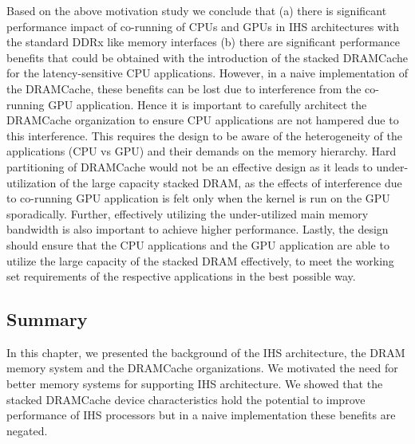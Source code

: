 \par Based on the above motivation study we conclude that (a) there is significant performance impact of co-running of CPUs and GPUs in IHS architectures with the standard DDRx like memory interfaces (b) there are significant performance benefits that could be obtained 
with the introduction of the stacked DRAMCache for the latency-sensitive CPU applications. However, in a naive implementation
of the DRAMCache, these benefits can be lost due to interference from the co-running GPU application.  Hence it is important to carefully 
architect the DRAMCache organization to ensure CPU applications are not hampered due to this interference.
This requires the design to be aware of the heterogeneity of the applications (CPU vs GPU) and their demands on the 
memory hierarchy.  Hard partitioning of DRAMCache would not be an effective design as it leads to under-utilization of the large capacity 
stacked DRAM, as the effects of interference due to co-running GPU application is felt only when the kernel is run on the GPU sporadically. 
Further, effectively utilizing the under-utilized main memory bandwidth \cite{micro-refresh, mainak-hpca, bear}
is also important to achieve higher performance.  Lastly, the design should ensure that the CPU applications and the 
GPU application are able to utilize the large capacity of the stacked DRAM effectively, to meet the working set 
requirements of the respective applications in the best possible way.

\subsection{Summary}
In this chapter, we presented the background of the IHS architecture, the DRAM memory system and the DRAMCache organizations. We motivated the need for better memory systems for supporting IHS architecture. We showed that the stacked DRAMCache device characteristics hold the potential to improve performance of IHS processors but in a naive implementation these benefits are negated.